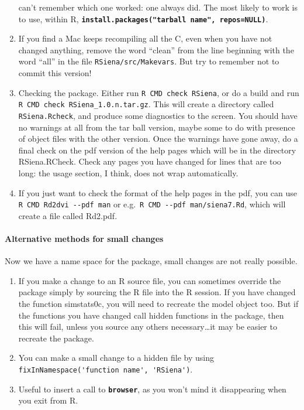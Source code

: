 \documentclass[12pt, a4paper]{article}
\renewcommand{\=}{\,=\,}
\newcommand{\+}{\,+\,}
\newcommand{\sfn}[1]{\textbf{\texttt{#1}}}
\begin{document}
\begin{enumerate}
  can't remember which one worked: one always did. The most likely to work is to
  use, within R, \sfn{install.packages("tarball name", repos=NULL)}.
\item If you find a Mac keeps recompiling all the C, even when you have not
  changed anything, remove the word ``clean'' from the line beginning with the
  word ``all'' in the file \verb|RSiena/src/Makevars|. But try to remember not
  to commit this version!
\item Checking the package. Either run \verb|R CMD check RSiena|, or do a build
  and run \verb|R CMD check RSiena_1.0.n.tar.gz|. This will create a directory
  called \verb|RSiena.Rcheck|, and produce some diagnostics to the screen. You
  should have no warnings at all from the tar ball version, maybe some to do
  with presence of object files with the other version. Once the warnings have
  gone away, do a final check on the pdf version of the help pages which will be
  in the directory RSiena.RCheck. Check any pages you have changed for lines
  that are too long: the usage section, I think, does not wrap automatically.
\item If you just want to check the format of the help pages in  the pdf, you
  can use
\verb|R CMD Rd2dvi --pdf man| or e.g.\ \verb|R CMD --pdf man/siena7.Rd|, which
will create a file called Rd2.pdf.
\end{enumerate}
\paragraph{Alternative methods for small changes}
Now we have a \textsf{name space} for the package, small changes are not really
possible.
\begin{enumerate}
\item If you make a change to an R source file, you can sometimes override the
  package simply by sourcing the R file into the R session. If you have changed
  the function \textsf{simstats0c}, you will need to recreate the model object
  too. But if the functions you have changed call hidden functions in the
  package, then this will fail, unless you source any others necessary\ldots it
  may be easier to recreate the package.
\item You can make a small change to a hidden file by using
\verb|fixInNamespace('function name', 'RSiena')|.
\item Useful to insert a call to \sfn{browser}, as you won't mind it
  disappearing when you exit from R.
\end{enumerate}
\end{document}
